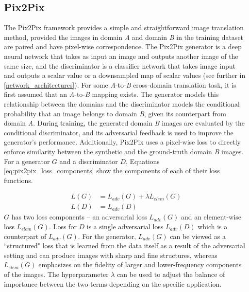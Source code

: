 \subsection{Pix2Pix}
\label{pix2pix}
The Pix2Pix framework provides a simple and straightforward image translation method, provided the images in domain \textit{A} and domain \textit{B} in the training dataset are paired and have pixel-wise correspondence. The Pix2Pix generator is a deep neural network that takes as input an image and outputs another image of the same size, and the discriminator is a classifier network that takes image input and outputs a scalar value or a downsampled map of scalar values (see further in \ref{network_architectures}). For some \textit{A}-to-\textit{B} cross-domain translation task, it is first assumed that an \textit{A}-to-\textit{B} mapping exists. The generator models this relationship between the domains and the discriminator models the conditional probability that an image belongs to domain \textit{B}, given its counterpart from domain \textit{A}. During training, the generated domain \textit{B} images are evaluated by the conditional discriminator, and its adversarial feedback is used to improve the generator's performance. Additionally, Pix2Pix uses a pixel-wise loss to directly enforce similarity between the synthetic and the ground-truth domain \textit{B} images. For a generator $G$ and a discriminator $D$, Equations \ref{eq:pix2pix_loss_components} show the components of each of their loss functions. 

\begin{equation}
    \begin{aligned}
    L(G) &= L_{adv}(G) + \lambda L_{elem}(G) \\
    L(D) &= L_{adv}(D)
    \end{aligned}
    \label{eq:pix2pix_loss_components}
\end{equation}
$G$ has two loss components -- an adversarial loss $L_{adv}(G)$ and an element-wise loss $L_{elem}(G)$. Loss for $D$ is a single adversarial loss $L_{adv}(D)$ which is a counterpart of $L_{adv}(G)$. For the generator, $L_{adv}(G)$ can be viewed as a ``structured" loss that is learned from the data itself as a result of the adversarial setting and can produce images with sharp and fine structures, whereas $L_{elem}(G)$ emphasizes on the fidelity of larger and lower-frequency components of the images. The hyperparameter $\lambda$ can be used to adjust the balance of importance between the two terms depending on the specific application.


